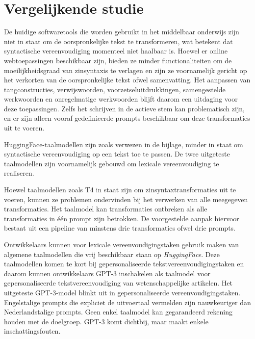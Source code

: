 


\section{Vergelijkende studie}


De huidige softwaretools die worden gebruikt in het middelbaar onderwijs zijn niet in staat om de oorspronkelijke tekst te transformeren, wat betekent dat syntactische vereenvoudiging momenteel niet haalbaar is. Hoewel er online webtoepassingen beschikbaar zijn, bieden ze minder functionaliteiten om de moeilijkheidsgraad van zinsyntaxis te verlagen en zijn ze voornamelijk gericht op het verkorten van de oorspronkelijke tekst ofwel samenvatting. Het aanpassen van tangconstructies, verwijswoorden, voorzetseluitdrukkingen, samengestelde werkwoorden en onregelmatige werkwoorden blijft daarom een uitdaging voor deze toepassingen. Zelfs het schrijven in de actieve stem kan problematisch zijn, en er zijn alleen vooraf gedefinieerde prompts beschikbaar om deze transformaties uit te voeren.

\medspace

HuggingFace-taalmodellen zijn zoals verwezen in de bijlage, minder in staat om syntactische vereenvoudiging op een tekst toe te passen. De twee uitgeteste taalmodellen zijn voornamelijk gebouwd om lexicale vereenvoudiging te realiseren.

Hoewel taalmodellen zoals T4 in staat zijn om zinsyntaxtransformaties uit te voeren, kunnen ze problemen ondervinden bij het verwerken van alle meegegeven transformaties. Het taalmodel kan transformaties ontbreken als alle transformaties in één prompt zijn betrokken. De voorgestelde aanpak hiervoor bestaat uit een pipeline van minstens drie transformaties ofwel drie prompts. 

\medspace

Ontwikkelaars kunnen voor lexicale vereenvoudigingstaken gebruik maken van algemene taalmodellen die vrij beschikbaar staan op \textit{HuggingFace}. Deze taalmodellen komen te kort bij gepersonaliseerde tekstvereenvoudigingstaken en daarom kunnen ontwikkelaars GPT-3 inschakelen als taalmodel voor gepersonaliseerde tekstvereenvoudiging van wetenschappelijke artikelen. Het uitgeteste GPT-3-model blinkt uit in gepersonaliseerde vereenvoudigingstaken. Engelstalige prompts die expliciet de uitvoertaal vermelden zijn nauwkeuriger dan Nederlandstalige prompts. Geen enkel taalmodel kan gegarandeerd rekening houden met de doelgroep. GPT-3 komt dichtbij, maar maakt enkele inschattingsfouten.

